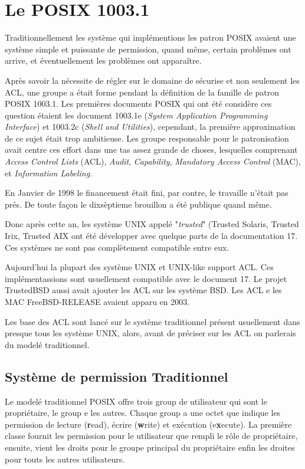 \section{Le POSIX 1003.1}


Traditionnellement les système qui implémentions les patron POSIX avaient une système simple et puissante de permission, quand même, certain problèmes ont arrive, et éventuellement les problèmes ont apparaître. 

Après savoir la nécessite de régler sur le domaine de sécurise et non seulement les ACL, une groupe a était forme pendant la définition de la famille de patron POSIX 1003.1. Les premières documents POSIX qui ont été considère ces question étaient les document 1003.1e (\emph{System Application Programming Interface}) et 1003.2c (\emph{Shell and Utilities}), cependant, la première approximation de ce sujet était trop ambitieuse. Les groupe responsable pour le patronisation avait centre ces effort dans une tas assez grande de choses, lesquelles  comprenant \emph{Access Control Lists} (ACL), \emph{Audit}, \emph{Capability},\emph{ Mandatory Access Control }(MAC), et \emph{Information Labeling}\cite{aclsuse}.

En Janvier de 1998\cite{aclsuse} le financement était fini, par contre, le travaille n'était pas prés. De toute façon le dixsèptieme brouillon a été publique quand même\cite{posix17}.

Donc après cette an, les système UNIX appelé "\emph{trusted}" (Trusted Solaris, Trusted Irix, Trusted AIX ont été développer avec quelque parts de la documentation 17. Ces systèmes ne sont pas complètement compatible entre eux. 

Aujourd'hui la plupart des système UNIX et UNIX-like support ACL. Ces implémentassions sont usuellement compatible avec le document 17. Le projet TrustedBSD aussi avait ajouter les ACL sur les système BSD. Les ACL e les MAC  FreeBSD-RELEASE avaient apparu en 2003.

Les base des ACL sont lancé sur le système traditionnel présent usuellement dans presque tous les système UNIX, alors, avant de préciser sur les ACL on parlerais du modelé traditionnel.

\subsection*{Système de permission Traditionnel}

Le modelé traditionnel POSIX offre trois group de utilisateur qui sont le propriétaire, le group e les autres. Chaque group a une octet que indique les permission de lecture (\textbf{r}ead), écrire (\textbf{w}rite) et exécution (e\textbf{x}ecute). La première classe fournit les permission pour le utilisateur que rempli le rôle de propriétaire, ensuite, vient les droits pour le groupe principal du propriétaire enfin les droites pour touts les autres utilisateurs. 
 
